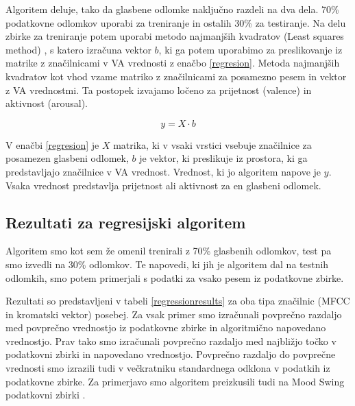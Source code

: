\documentclass[a4paper, 12pt]{book}
\begin{document}
{Algoritem deluje, tako da glasbene odlomke naključno razdeli na dva dela. 70\% podatkovne odlomkov uporabi za treniranje in ostalih 30\% za testiranje. Na delu zbirke za treniranje potem uporabi metodo najmanjših kvadratov (Least squares method) \cite{abdi2007method}, s katero izračuna vektor $b$, ki ga potem uporabimo za preslikovanje iz matrike z značilnicami v VA vrednosti z enačbo \ref{regresion}. Metoda najmanjših kvadratov kot vhod vzame matriko z značilnicami za posamezno pesem in vektor z VA vrednostmi. Ta postopek izvajamo ločeno za prijetnost (valence) in aktivnost (arousal).  

\begin{equation} 
\label{regresion}
y = X \cdot b
\end{equation} 

V enačbi \ref{regresion} je $X$ matrika, ki v vsaki vrstici vsebuje značilnice za posamezen glasbeni odlomek, $b$ je vektor, ki preslikuje iz prostora, ki ga predstavljajo značilnice v VA vrednost. Vrednost, ki jo algoritem napove je $y$. Vsaka vrednost predstavlja prijetnost ali aktivnost za en glasbeni odlomek. 

\subsection{Rezultati za regresijski algoritem}

Algoritem smo kot sem že omenil trenirali z 70\% glasbenih odlomkov, test pa smo izvedli na 30\% odlomkov. Te napovedi, ki jih je algoritem dal na testnih odlomkih, smo potem primerjali s podatki za vsako pesem iz podatkovne zbirke.

Rezultati so predstavljeni v tabeli \ref{regressionresults} za oba tipa značilnic (MFCC in kromatski vektor) posebej. Za vsak primer smo izračunali povprečno razdaljo med povprečno vrednostjo iz podatkovne zbirke in algoritmično napovedano vrednostjo. Prav tako smo izračunali povprečno razdaljo med najbližjo točko v podatkovni zbirki in napovedano vrednostjo. Povprečno razdaljo do povprečne vrednosti smo izrazili tudi v večkratniku standardnega odklona v podatkih iz podatkovne zbirke. Za primerjavo smo algoritem preizkusili tudi na Mood Swing podatkovni zbirki \cite{schmidt2011modeling}. 

}
\end{document}
